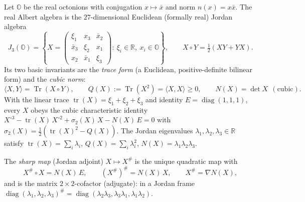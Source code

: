\documentclass[11pt]{article}
\theoremstyle{plain}
\theoremstyle{definition}
\theoremstyle{remark}
\begin{document}
Let $\mathbb O$ be the real octonions with conjugation $x\mapsto\bar x$ and norm
$n(x)=x\bar x$. The real Albert algebra is the $27$-dimensional Euclidean (formally real)
Jordan algebra
\begin{equation}
\label{eq:potential:albert}
J_3(\mathbb O)=\left\{
X=\begin{pmatrix}\xi_1 & x_3 & \bar x_2\\ \bar x_3 & \xi_2 & x_1\\ x_2 & \bar x_1 & \xi_3\end{pmatrix}
:\ \xi_i\in\mathbb R,\ x_i\in\mathbb O\right\},
\qquad X\circ Y=\tfrac12(XY+YX).
\end{equation}
Its two basic invariants are the \emph{trace form} (a Euclidean, positive-definite bilinear
form) and the \emph{cubic norm}:
\begin{equation}
\label{eq:potential:invariants}
\langle X,Y\rangle=\operatorname{Tr}(X\circ Y),\qquad
Q(X):=\operatorname{Tr}(X^2)=\langle X,X\rangle\ge0,\qquad
N(X)=\det X\ \ (\text{cubic}).
\end{equation}
With the linear trace $\operatorname{tr}(X)=\xi_1+\xi_2+\xi_3$ and identity
$E=\operatorname{diag}(1,1,1)$, every $X$ obeys the cubic characteristic identity
$X^{\circ3}-\operatorname{tr}(X)\,X^{\circ2}+\sigma_2(X)\,X-N(X)\,E=0$ with
$\sigma_2(X)=\tfrac12(\operatorname{tr}(X)^2-Q(X))$. The Jordan eigenvalues
$\lambda_1,\lambda_2,\lambda_3\in\mathbb R$ satisfy
$\operatorname{tr}(X)=\sum_i\lambda_i$, $Q(X)=\sum_i\lambda_i^2$,
$N(X)=\lambda_1\lambda_2\lambda_3$.

The \emph{sharp map} (Jordan adjoint) $X\mapsto X^\#$ is the unique quadratic map with
\begin{equation}
\label{eq:potential:sharp}
X^\#\circ X=N(X)\,E,\qquad (X^\#)^\#=N(X)\,X,\qquad X^\#=\nabla N(X),
\end{equation}
and is the matrix $2\times2$-cofactor (adjugate): in a Jordan frame
$\operatorname{diag}(\lambda_1,\lambda_2,\lambda_3)^\#
=\operatorname{diag}(\lambda_2\lambda_3,\lambda_3\lambda_1,\lambda_1\lambda_2)$.
\end{document}
